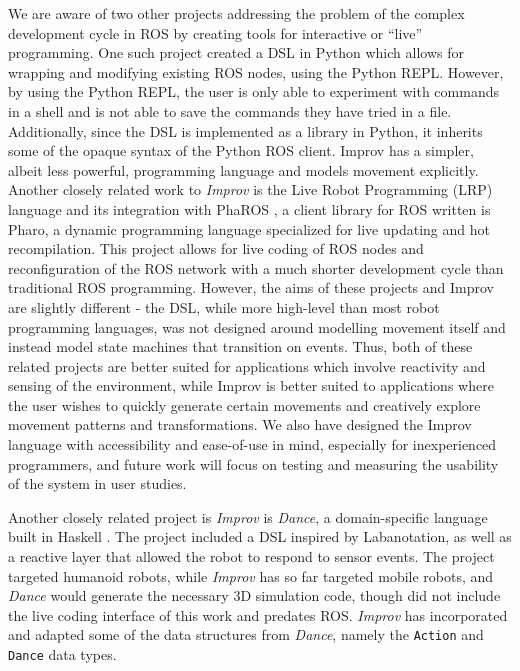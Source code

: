\documentclass[sigconf]{acmart}
\begin{document}
We are aware of two other projects addressing the problem of the complex
development cycle in ROS by creating tools for interactive or ``live''
programming. One such project \cite{python_live_DSLRob} created a DSL in Python
which allows for wrapping and modifying existing ROS nodes, using the Python
REPL. However, by using the Python REPL, the user is only able to experiment
with commands in a shell and is not able to save the commands they have tried in
a file. Additionally, since the DSL is implemented as a library in Python, it
inherits some of the opaque syntax of the Python ROS client. Improv has a
simpler, albeit less powerful, programming language and models movement
explicitly. Another closely related work to \emph{Improv} is the Live Robot
Programming (LRP) language \cite{campusano2017live} and its integration with PhaROS
\cite{estefo2014towards}, a client library for ROS written is Pharo, a dynamic
programming language specialized for live updating and hot recompilation. This
project allows for live coding of ROS nodes and reconfiguration of the ROS
network with a much shorter development cycle than traditional ROS programming.
However, the aims of these projects and Improv are slightly different - the DSL,
while more high-level than most robot programming languages, was not designed
around modelling movement itself and instead model state machines that
transition on events. Thus, both of these related projects are better suited for
applications which involve reactivity and sensing of the environment, while
Improv is better suited to applications where the user wishes to quickly
generate certain movements and creatively explore movement patterns and
transformations. We also have designed the Improv language with accessibility
and ease-of-use in mind, especially for inexperienced programmers, and future
work will focus on testing and measuring the usability of the system in user
studies.

Another closely related project is \emph{Improv} is \emph{Dance}, a
domain-specific language built in Haskell \cite{Dance2003}. The project included
a DSL inspired by Labanotation, as well as a reactive layer that allowed
the robot to respond to sensor events. The project targeted humanoid
robots, while \emph{Improv} has so far targeted mobile robots, and
\emph{Dance} would generate the necessary 3D simulation code, though did
not include the live coding interface of this work and predates ROS.
\emph{Improv} has incorporated and adapted some of the data structures
from \emph{Dance}, namely the \texttt{Action} and \texttt{Dance} data
types.
\end{document}
